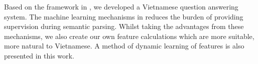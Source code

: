 Based on the framework in \cite{Clarke:2010:DSP:1870568.1870571}, we developed a Vietnamese question answering system. The machine learning mechanisms in \cite{Clarke:2010:DSP:1870568.1870571} reduces the burden of providing supervision during semantic parsing. Whilst taking the advantages from these mechanisms, we also create our own feature calculations which are more suitable, more natural to Vietnamese. A method of dynamic learning of features is also presented in this work.